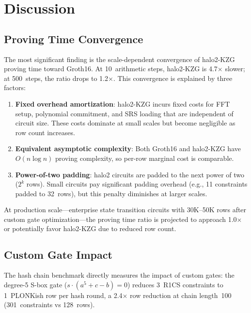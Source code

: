 
\section{Discussion}
\label{sec:discussion}

\subsection{Proving Time Convergence}

The most significant finding is the scale-dependent convergence
of halo2-KZG proving time toward Groth16. At 10~arithmetic
steps, halo2-KZG is 4.7$\times$ slower; at 500~steps, the ratio
drops to 1.2$\times$. This convergence is explained by three
factors:

\begin{enumerate}
  \item \textbf{Fixed overhead amortization}: halo2-KZG incurs
    fixed costs for FFT setup, polynomial commitment, and SRS
    loading that are independent of circuit size. These costs
    dominate at small scales but become negligible as row count
    increases.
  \item \textbf{Equivalent asymptotic complexity}: Both Groth16
    and halo2-KZG have $O(n \log n)$ proving complexity, so
    per-row marginal cost is comparable.
  \item \textbf{Power-of-two padding}: halo2 circuits are padded
    to the next power of two ($2^k$ rows). Small circuits pay
    significant padding overhead (e.g., 11 constraints padded to
    32~rows), but this penalty diminishes at larger scales.
\end{enumerate}

At production scale---enterprise state transition circuits with
30K--50K rows after custom gate optimization---the proving time
ratio is projected to approach 1.0$\times$ or potentially favor
halo2-KZG due to reduced row count.

\subsection{Custom Gate Impact}

The hash chain benchmark directly measures the impact of custom
gates: the degree-5 S-box gate ($s \cdot (a^5 + c - b) = 0$)
reduces 3~R1CS constraints to 1~PLONKish row per hash round,
a 2.4$\times$ row reduction at chain length~100 (301~constraints
vs 128~rows).

